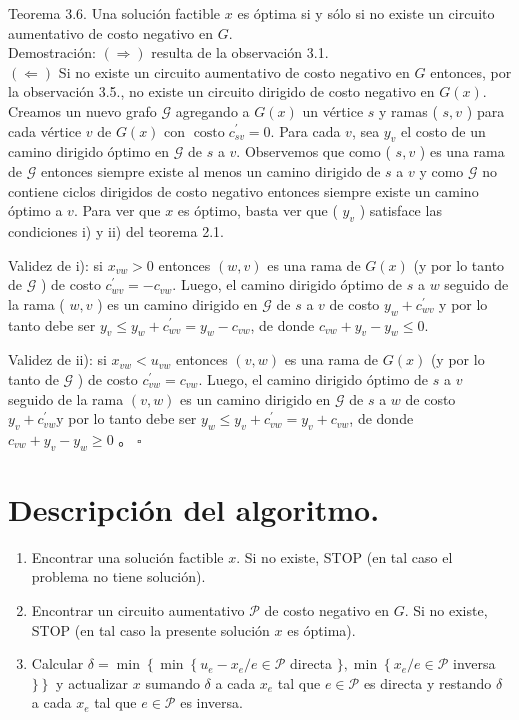 \documentclass[10pt]{article}
\begin{document}
Teorema 3.6. Una solución factible $x$ es óptima si y sólo si no existe un circuito aumentativo de costo negativo en $G$.\\
Demostración: $(\Longrightarrow)$ resulta de la observación 3.1.\\
$(\Longleftarrow)$ Si no existe un circuito aumentativo de costo negativo en $G$ entonces, por la observación 3.5., no existe un circuito dirigido de costo negativo en $G(x)$. Creamos un nuevo grafo $\mathcal{G}$ agregando a $G(x)$ un vértice $s$ y ramas ( $s, v$ ) para cada vértice $v$ de $G(x)$ con $\operatorname{costo} c_{s v}^{\prime}=0$. Para cada $v$, sea $y_{v}$ el costo de un camino dirigido óptimo en $\mathcal{G}$ de $s$ a $v$. Observemos que como ( $s, v$ ) es una rama de $\mathcal{G}$ entonces siempre existe al menos un camino dirigido de $s$ a $v$ y como $\mathcal{G}$ no contiene ciclos dirigidos de costo negativo entonces siempre existe un camino óptimo a $v$. Para ver que $x$ es óptimo, basta ver que ( $y_{v}$ ) satisface las condiciones i) y ii) del teorema 2.1.

Validez de i): si $x_{v w}>0$ entonces $(w, v)$ es una rama de $G(x)$ (y por lo tanto de $\mathcal{G}$ ) de costo $c_{w v}^{\prime}=-c_{v w}$. Luego, el camino dirigido óptimo de $s$ a $w$ seguido de la rama ( $w, v$ ) es un camino dirigido en $\mathcal{G}$ de $s$ a $v$ de costo $y_{w}+c_{w v}^{\prime}$ y por lo tanto debe ser $y_{v} \leq y_{w}+c_{w v}^{\prime}=y_{w}-c_{v w}$, de donde $c_{v w}+y_{v}-y_{w} \leq 0$.

Validez de ii): si $x_{v w}<u_{v w}$ entonces $(v, w)$ es una rama de $G(x)$ (y por lo tanto de $\mathcal{G}$ ) de costo $c_{v w}^{\prime}=c_{v w}$. Luego, el camino dirigido óptimo de $s$ a $v$ seguido de la rama $(v, w)$ es un camino dirigido en $\mathcal{G}$ de $s$ a $w$ de costo $y_{v}+c_{v w}^{\prime} \mathrm{y}$ por lo tanto debe ser $y_{w} \leq y_{v}+c_{v w}^{\prime}=y_{v}+c_{v w}$, de donde $c_{v w}+y_{v}-y_{w} \geq 0$ 。 $\square$

\section*{Descripción del algoritmo.}
\begin{enumerate}
  \item Encontrar una solución factible $x$. Si no existe, STOP (en tal caso el problema no tiene solución).
  \item Encontrar un circuito aumentativo $\mathcal{P}$ de costo negativo en $G$. Si no existe, STOP (en tal caso la presente solución $x$ es óptima).
  \item Calcular $\delta=\min \left\{\min \left\{u_{e}-x_{e} / e \in \mathcal{P}\right.\right.$ directa $\}, \min \left\{x_{e} / e \in \mathcal{P}\right.$ inversa $\left.\}\right\}$ y actualizar $x$ sumando $\delta$ a cada $x_{e}$ tal que $e \in \mathcal{P}$ es directa y restando $\delta$ a cada $x_{e}$ tal que $e \in \mathcal{P}$ es inversa.
\end{enumerate}
\end{document}
